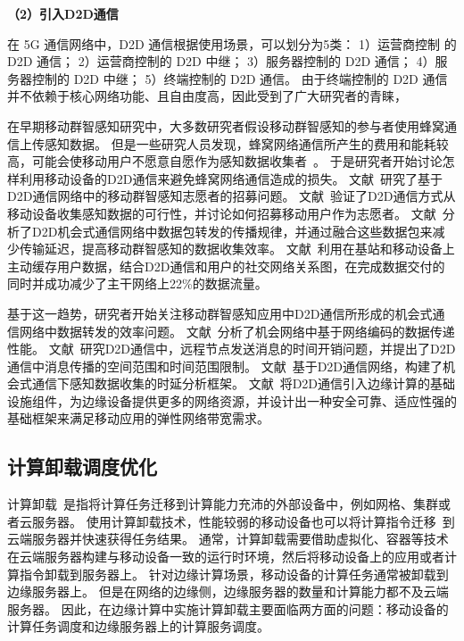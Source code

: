 \textbf{（2）引入D2D通信}

在 5G 通信网络中，D2D 通信根据使用场景，可以划分为5类：
1）运营商控制 的 D2D 通信；%
2）运营商控制的 D2D 中继；%
3）服务器控制的 D2D 通信；%
4）服务器控制的 D2D 中继；%
5）终端控制的 D2D 通信。%
由于终端控制的 D2D 通信并不依赖于核心网络功能、且自由度高，因此受到了广大研究者的青睐，

在早期移动群智感知研究中，大多数研究者假设移动群智感知的参与者使用蜂窝通信上传感知数据。
但是一些研究人员发现，蜂窝网络通信所产生的费用和能耗较高，可能会使移动用户不愿意自愿作为感知数据收集者~\cite{DBLP:conf/globecom/ZhangJLLC16,DBLP:conf/icdcs/XiaoWHHH16}。
于是研究者开始讨论怎样利用移动设备的D2D通信来避免蜂窝网络通信造成的损失。
文献~研究了基于D2D通信网络中的移动群智感知志愿者的招募问题。
文献~验证了D2D通信方式从移动设备收集感知数据的可行性，并讨论如何招募移动用户作为志愿者。 
文献~分析了D2D机会式通信网络中数据包转发的传播规律，并通过融合这些数据包来减少传输延迟，提高移动群智感知的数据收集效率。
文献~利用在基站和移动设备上主动缓存用户数据，结合D2D通信和用户的社交网络关系图，在完成数据交付的同时并成功减少了主干网络上22\%的数据流量。

基于这一趋势，研究者开始关注移动群智感知应用中D2D通信所形成的机会式通信网络中数据转发的效率问题。
文献~分析了机会网络中基于网络编码的数据传递性能。
文献~研究D2D通信中，远程节点发送消息的时间开销问题，并提出了D2D通信中消息传播的空间范围和时间范围限制。
文献~基于D2D通信网络，构建了机会式通信下感知数据收集的时延分析框架。
文献~将D2D通信引入边缘计算的基础设施组件，为边缘设备提供更多的网络资源，并设计出一种安全可靠、适应性强的基础框架来满足移动应用的弹性网络带宽需求。

\subsection{计算卸载调度优化}

计算卸载~\cite{DBLP:journals/network/MaZZWP13}是指将计算任务迁移到计算能力充沛的外部设备中，例如网格、集群或者云服务器。
使用计算卸载技术，性能较弱的移动设备也可以将计算指令迁移~\cite{DBLP:journals/monet/KumarLLB13}到云端服务器并快速获得任务结果。
通常，计算卸载需要借助虚拟化、容器等技术在云端服务器构建与移动设备一致的运行时环境，然后将移动设备上的应用或者计算指令卸载到服务器上。
针对边缘计算场景，移动设备的计算任务通常被卸载到边缘服务器上。
但是在网络的边缘侧，边缘服务器的数量和计算能力都不及云端服务器。
因此，在边缘计算中实施计算卸载主要面临两方面的问题：移动设备的计算任务调度和边缘服务器上的计算服务调度。

